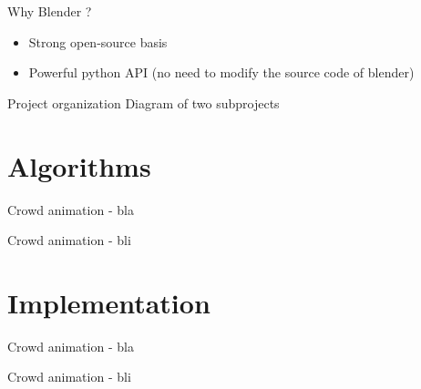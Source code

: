 \documentclass{beamer}
\begin{document}
\begin{frame}{Why Blender ?}
  \begin{itemize}
    \item Strong open-source basis
    \item Powerful python API (no need to modify the source code of blender)
  \end{itemize}
\end{frame}

\begin{frame}{Project organization}
  Diagram of two subprojects
\end{frame}

\section{Algorithms}
\begin{frame}{Crowd animation - }
  bla
\end{frame}

\begin{frame}{Crowd animation - }
  bli
\end{frame}

\section{Implementation}
\begin{frame}{Crowd animation - }
  bla
\end{frame}

\begin{frame}{Crowd animation - }
  bli
\end{frame}

\bgroup
{}
\begin{frame}[plain]{}
\end{frame}
\egroup
\end{document}

